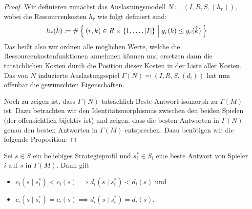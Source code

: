 \begin{proof}
	Wir definieren zunächst das Auslastungsmodell $N \coloneqq (I, R, S, (h_r))$, wobei die Ressourcenkosten $h_{\hat{r}}$ wie folgt definiert sind:
		\[h_{\hat{r}}(\hat{k}) \coloneqq \#\Set{(r, k) \in R\times \{1, \dots, \left|I\right|\} | g_r(k) \leq g_{\hat{r}}(\hat{k})} \]
	Das heißt also wir ordnen alle möglichen Werte, welche die Ressourcenkostenfunktionen annehmen können und ersetzen dann die tatsächlichen Kosten durch die Position dieser Kosten in der Liste aller Kosten. Das von $N$ induzierte Auslastungsspiel $\Gamma(N) \eqqcolon (I, R, S, (d_i))$ hat nun offenbar die gewünschten Eigenschaften. 
	
	Noch zu zeigen ist, dass $\Gamma(N)$ tatsächlich Beste-Antwort-isomorph zu $\Gamma(M)$ ist. Dazu betrachten wir den Identitätsmorphismus zwischen den beiden Spielen (der offensichtlich bijektiv ist) und zeigen, dass die besten Antworten in $\Gamma(N)$ genau den besten Antworten in $\Gamma(M)$ entsprechen. Dazu benötigen wir die folgende Proposition:	\noqed
\end{proof}
	
\begin{prop}\label{prop:BAPotentialFuerMatroidspieleHilfsP}
	Sei $s \in S$ ein beliebiges Strategieprofil und $s^\ast_i \in S_i$ eine beste Antwort von Spieler $i$ auf $s$ in $\Gamma(M)$. Dann gilt
	\begin{itemize}
		\item $c_i(s \mid s^\ast_i) < c_i(s) \implies d_i(s \mid s^\ast_i) < d_i(s)$ und
		\item $c_i(s \mid s^\ast_i) = c_i(s) \implies d_i(s \mid s^\ast_i) = d_i(s)$.
	\end{itemize}
\end{prop}

